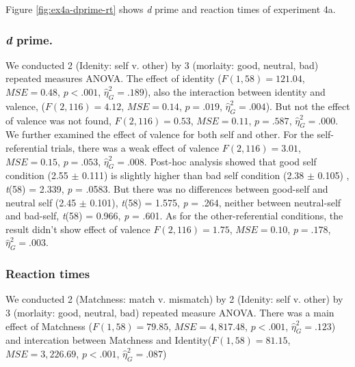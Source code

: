 \documentclass[man]{apa6}
\begin{document}
Figure \ref{fig:ex4a-dprime-rt} shows \emph{d} prime and reaction times of experiment 4a.

\hypertarget{d-prime.-1}{%
\subsubsection{\texorpdfstring{\emph{d} prime.}{d prime.}}\label{d-prime.-1}}

We conducted 2 (Idenity: self v. other) by 3 (morlaity: good, neutral, bad) repeated measures ANOVA. The effect of identity (\(F(1, 58) = 121.04\), \(\mathit{MSE} = 0.48\), \(p < .001\), \(\hat{\eta}^2_G = .189\)), also the interaction between identity and valence, (\(F(2, 116) = 4.12\), \(\mathit{MSE} = 0.14\), \(p = .019\), \(\hat{\eta}^2_G = .004\)). But not the effect of valence was not found, \(F(2, 116) = 0.53\), \(\mathit{MSE} = 0.11\), \(p = .587\), \(\hat{\eta}^2_G = .000\). We further examined the effect of valence for both self and other. For the self-referential trials, there was a weak effect of valence \(F(2, 116) = 3.01\), \(\mathit{MSE} = 0.15\), \(p = .053\), \(\hat{\eta}^2_G = .008\). Post-hoc analysis showed that good self condition (2.55 \(\pm\) 0.111) is slightly higher than bad self condition (2.38 \(\pm\) 0.105) , \emph{t}(58) = 2.339, \emph{p} = .0583. But there was no differences between good-self and neutral self (2.45 \(\pm\) 0.101), \emph{t}(58) = 1.575, \emph{p} = .264, neither between neutral-self and bad-self, \emph{t}(58) = 0.966, \emph{p} = .601. As for the other-referential conditions, the result didn't show effect of valence \(F(2, 116) = 1.75\), \(\mathit{MSE} = 0.10\), \(p = .178\), \(\hat{\eta}^2_G = .003\).

\hypertarget{reaction-times}{%
\subsubsection{Reaction times}\label{reaction-times}}

We conducted 2 (Matchness: match v. mismatch) by 2 (Idenity: self v. other) by 3 (morlaity: good, neutral, bad) repeated measure ANOVA. There was a main effect of Matchness (\(F(1, 58) = 79.85\), \(\mathit{MSE} = 4,817.48\), \(p < .001\), \(\hat{\eta}^2_G = .123\)) and intercation between Matchness and Identity(\(F(1, 58) = 81.15\), \(\mathit{MSE} = 3,226.69\), \(p < .001\), \(\hat{\eta}^2_G = .087\))
\end{document}
